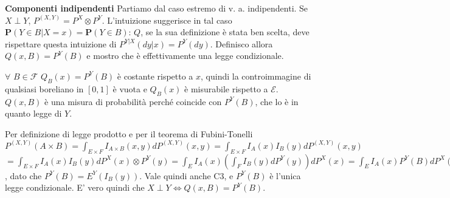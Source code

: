 \documentclass{article}
\begin{document}
\begin{description}
\item[1] \textbf{Componenti indipendenti} Partiamo dal caso estremo di v. a.
indipendenti. Se $X\perp Y$, $P^{\left( X,Y\right) }=P^{X}\otimes P^{Y}$.
L'intuizione suggerisce in tal caso $\mathbf{P}\left( Y\in B|X=x\right) =%
\mathbf{P}\left( Y\in B\right) $: $Q$, se la sua definizione \`{e} stata ben
scelta, deve rispettare questa intuizione di $P^{Y|X}\left( dy|x\right)
=P^{Y}\left( dy\right) $. Definisco allora $Q\left( x,B\right) =P^{Y}\left(
B\right) $ e mostro che \`{e} effettivamente una legge condizionale.

\item $\forall $ $B\in \mathcal{F}$ $Q_{B}\left( x\right) =P^{Y}\left(
B\right) $ \`{e} costante rispetto a $x$, quindi la controimmagine di
qualsiasi boreliano in $\left[ 0,1\right] $ \`{e} vuota e $Q_{B}\left(
x\right) $ \`{e} misurabile rispetto a $\mathcal{E}$. $Q\left( x,B\right) $ 
\`{e} una misura di probabilit\`{a} perch\'{e} coincide con $P^{Y}\left(
B\right) $, che lo \`{e} in quanto legge di $Y$.

\item Per definizione di legge prodotto e per il teorema di Fubini-Tonelli $%
P^{\left( X,Y\right) }\left( A\times B\right) =\int_{E\times F}I_{A\times
B}\left( x,y\right) dP^{\left( X,Y\right) }\left( x,y\right) =\int_{E\times
F}I_{A}\left( x\right) I_{B}\left( y\right) dP^{\left( X,Y\right) }\left(
x,y\right) $ $=\int_{E\times F}I_{A}\left( x\right) I_{B}\left( y\right)
dP^{X}\left( x\right) \otimes P^{Y}\left( y\right) =\int_{E}I_{A}\left(
x\right) \left( \int_{F}I_{B}\left( y\right) dP^{Y}\left( y\right) \right)
dP^{X}\left( x\right) =\int_{E}I_{A}\left( x\right) P^{Y}\left( B\right)
dP^{X}\left( x\right) $, dato che $P^{Y}\left( B\right) =E^{Y}\left(
I_{B}\left( y\right) \right) $. Vale quindi anche C3, e $P^{Y}\left(
B\right) $ \`{e} l'unica legge condizionale. E' vero quindi che $X\perp
Y\Longleftrightarrow Q\left( x,B\right) =P^{Y}\left( B\right) $.


\end{description}
\end{document}
